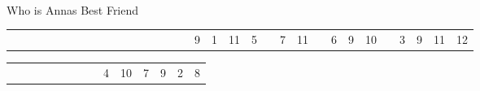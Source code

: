 \documentclass[20pt]{extarticle}
\begin{document}
\\
\\
\\
Who is Annas Best Friend
\\

  \begin{tabular}{cccc p{2em} cc p{2em} ccc p{2em} cccc}
  \underline{\hspace{1em}}&\underline{\hspace{1em}}&\underline{\hspace{1em}}&\underline{\hspace{1em}}&&\underline{\hspace{1em}}&\underline{\hspace{1em}}&&\underline{\hspace{1em}}&\underline{\hspace{1em}}&\underline{\hspace{1em}}&&\underline{\hspace{1em}}&\underline{\hspace{1em}}&\underline{\hspace{1em}}&\underline{\hspace{1em}}&
  9&1&11&5& &7&11& &6&9&10& &3&9&11&12&
\end{tabular}

  \begin{tabular}{ p{2em} cccccc}
  &\underline{\hspace{1em}}&\underline{\hspace{1em}}&\underline{\hspace{1em}}&\underline{\hspace{1em}}&\underline{\hspace{1em}}&\underline{\hspace{1em}}&
   &4&10&7&9&2&8&
\end{tabular}

\\
\end{document}
